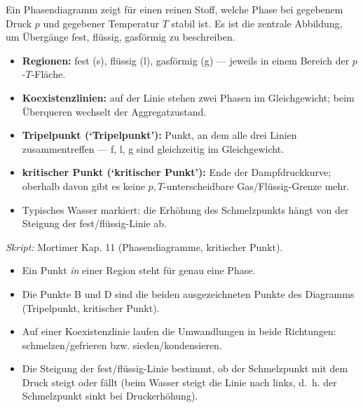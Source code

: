

Ein Phasendiagramm zeigt für einen reinen Stoff, welche Phase bei gegebenem
Druck $p$ und gegebener Temperatur $T$ stabil ist. Es ist die zentrale
Abbildung, um Übergänge fest, flüssig, gasförmig zu beschreiben.

\begin{werkzeugkasten}
\begin{itemize}
  \item \textbf{Regionen:} fest (s), flüssig (l), gasförmig (g) --- jeweils in
        einem Bereich der $p$-$T$-Fläche.
  \item \textbf{Koexistenzlinien:} auf der Linie stehen zwei Phasen im
        Gleichgewicht; beim Überqueren wechselt der Aggregatzustand.
  \item \textbf{Tripelpunkt (`Tripelpunkt'):} Punkt, an dem alle drei Linien
        zusammentreffen --- f, l, g sind gleichzeitig im Gleichgewicht.
  \item \textbf{kritischer Punkt (`kritischer Punkt'):} Ende der
        Dampfdruckkurve; oberhalb davon gibt es keine $p,T$-unterscheidbare
        Gas/Flüssig-Grenze mehr.
  \item Typisches Wasser markiert: die Erhöhung des Schmelzpunkts hängt von
        der Steigung der fest/flüssig-Linie ab.
\end{itemize}
\textit{Skript:} Mortimer Kap. 11 (Phasendiagramme, kritischer Punkt).
\end{werkzeugkasten}

\begin{achtung}
\begin{itemize}
  \item Ein Punkt \emph{in} einer Region steht für genau eine Phase.
  \item Die Punkte B und D sind die beiden ausgezeichneten Punkte des
        Diagramms (Tripelpunkt, kritischer Punkt).
  \item Auf einer Koexistenzlinie laufen die Umwandlungen in beide
        Richtungen: schmelzen/gefrieren bzw. sieden/kondensieren.
  \item Die Steigung der fest/flüssig-Linie bestimmt, ob der Schmelzpunkt
        mit dem Druck steigt oder fällt (beim Wasser steigt die Linie nach
        links, d.~h. der Schmelzpunkt sinkt bei Druckerhöhung).
\end{itemize}
\end{achtung}
